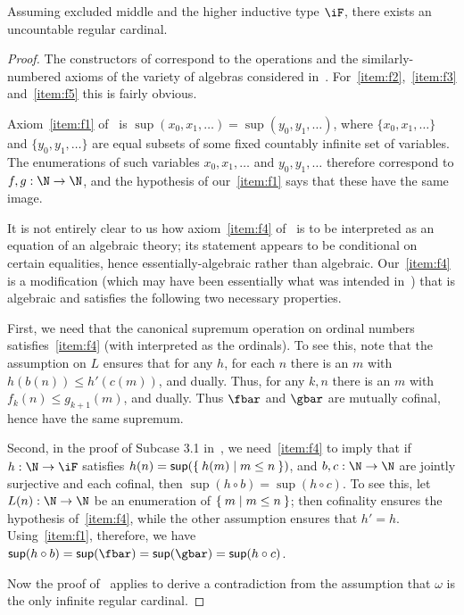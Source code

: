 \begin{enumerate}
\begin{thm}
  Assuming excluded middle and the higher inductive type $\iF$, there exists an uncountable regular cardinal.
\end{thm}
\begin{proof}
  The constructors of \iF correspond to the operations and the similarly-numbered axioms of the variety of algebras considered in~\cite[]{blass:freealg}.
  For~\ref{item:f2},~\ref{item:f3} and~\ref{item:f5} this is fairly obvious.

  Axiom~\ref{item:f1} of~\cite[]{blass:freealg} is $\sup(x_0,x_1,\dots) =\sup(y_0,y_1,\dots)$, where $\{x_0,x_1,\dots\}$ and $\{y_0,y_1,\dots\}$ are equal subsets of some fixed countably infinite set of variables.
  The enumerations of such variables $x_0,x_1,\dots$ and $y_0,y_1,\dots$ therefore correspond to $f,g:\N\to\N$, and the hypothesis of our~\ref{item:f1} says that these have the same image.

  It is not entirely clear to us how axiom~\ref{item:f4} of~\cite[]{blass:freealg} is to be interpreted as an equation of an algebraic theory; its statement appears to be conditional on certain equalities, hence essentially-algebraic rather than algebraic.
  Our~\ref{item:f4} is a modification (which may have been essentially what was intended in~\cite[]{blass:freealg}) that is algebraic and satisfies the following two necessary properties.

  First, we need that the canonical supremum operation on ordinal numbers satisfies~\ref{item:f4} (with \iF interpreted as the ordinals).
  To see this, note that the assumption on $L$ ensures that for any $h$, for each $n$ there is an $m$ with $h(b(n))\le h'(c(m))$, and dually.
  Thus, for any $k,n$ there is an $m$ with $f_k(n) \le g_{k+1}(m)$, and dually.
  Thus $\fbar$ and $\gbar$ are mutually cofinal, hence have the same supremum.

  Second, in the proof of Subcase 3.1 in~\cite[]{blass:freealg}, we need~\ref{item:f4} to imply that if $h:\N\to\iF$ satisfies $h(n) = \mathsf{sup}(\Set{ h(m) | m\le n})$, and $b,c:\N\to\N$ are jointly surjective and each cofinal, then $\sup(h\circ b)=\sup(h\circ c)$.
  To see this, let $L(n):\N\to\N$ be an enumeration of $\Set{m|m\le n}$; then cofinality ensures the hypothesis of~\ref{item:f4}, while the other assumption ensures that $h'=h$.
  Using~\ref{item:f1}, therefore, we have $\sup(h\circ b) = \sup(\fbar) = \sup(\gbar) = \sup(h\circ c)$.

  Now the proof of~\cite[]{blass:freealg} applies to derive a contradiction from the assumption that $\omega$ is the only infinite regular cardinal.
\end{proof}


\end{enumerate}
